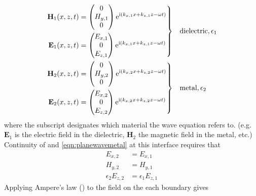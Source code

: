 \documentclass[a4paper,titlepage,onecolumn]{report}
\begin{document}
\begin{align}
\left.\begin{aligned}
\mathbf{H}_1(x,z,t) &=
\begin{pmatrix}
0\\
H_{y,1}\\
0
\end{pmatrix} {\mathrm{e}}^{{\mathrm{i}}(k_{x,1}x+k_{z,1}z-\omega t)}\\
\mathbf{E}_1(x,z,t) &=
\begin{pmatrix}
E_{x,1}\\
0\\
E_{z,1}\\
\end{pmatrix} {\mathrm{e}}^{{\mathrm{i}}(k_{x,1}x+k_{z,1}z-\omega t)}
\end{aligned}
\right\}& \quad \text{dielectric}, \epsilon_1\label{eqn:planewavedielectric}\\
\left.\begin{aligned}
\mathbf{H}_2(x,z,t) &=
\begin{pmatrix}
0\\
H_{y,2}\\
0
\end{pmatrix}
{\mathrm{e}}^{{\mathrm{i}}(k_{x,2}x+k_{z,2}z-\omega t)}\\
\mathbf{E}_2(x,z,t) &=
\begin{pmatrix}
E_{x,2}\\
0\\
E_{z,2}\\
\end{pmatrix}
{\mathrm{e}}^{{\mathrm{i}}(k_{x,2}x+k_{z,2}z-\omega t)}
\end{aligned} 
\right\}&\quad \text{metal}, \epsilon_2
\label{eqn:planewavemetal}
\end{align}
where the subscript designates which material the wave equation refers to.
(e.g. $\mathbf{E}_1$ is the electric field in the dielectric, $\mathbf{H}_2$
the magnetic field in the metal, etc.)
Continuity of  and
\ref{eqn:planewavemetal} at this interface requires that
\begin{align}
E_{x,2}&=E_{x,1}\\
H_{y,2}&=H_{y,1}\\
\epsilon_2 E_{z,2}&=\epsilon_1 E_{z,1}
\end{align}
Applying Ampere's law () to the field on the
each boundary gives
\end{document}
